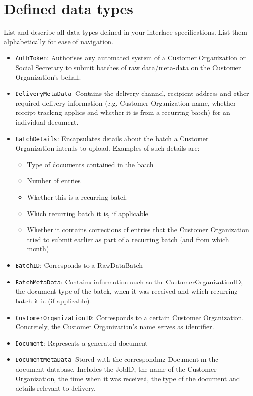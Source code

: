 \section{Defined data types}\label{app:datatypes}
List and describe all data types defined in your interface specifications. List
them alphabetically for ease of navigation.

\begin{itemize}
	\item \texttt{AuthToken}: Authorises any automated system of a Customer Organization or Social Secretary to submit batches of raw data/meta-data on the Customer Organization's behalf.
	\item \texttt{DeliveryMetaData}: Contains the delivery channel, recipient address and other required delivery information (e.g. Customer Organization name, whether receipt tracking applies and whether it is from a recurring batch) for an individual document.
	\item \texttt{BatchDetails}: Encapsulates details about the batch a Customer Organization intends to upload. Examples of such details are:
	\begin{itemize}
		\item Type of documents contained in the batch
		\item Number of entries
		\item Whether this is a recurring batch
		\item Which recurring batch it is, if applicable
		\item Whether it contains corrections of entries that the Customer Organization tried to submit earlier as part of a recurring batch (and from which month)
	\end{itemize}
	\item \texttt{BatchID}: Corresponds to a RawDataBatch
	\item \texttt{BatchMetaData}: Contains information such as the CustomerOrganizationID, the document type of the batch, when it was received and which recurring batch it is (if applicable).
	\item \texttt{CustomerOrganizationID}: Corresponds to a certain Customer Organization. Concretely, the Customer Organization's name serves as identifier.
	\item \texttt{Document}: Represents a generated document
	\item \texttt{DocumentMetaData}: Stored with the corresponding Document in the document database. Includes the JobID, the name of the Customer Organization, the time when it was received, the type of the document and details relevant to delivery.

\end{itemize}

